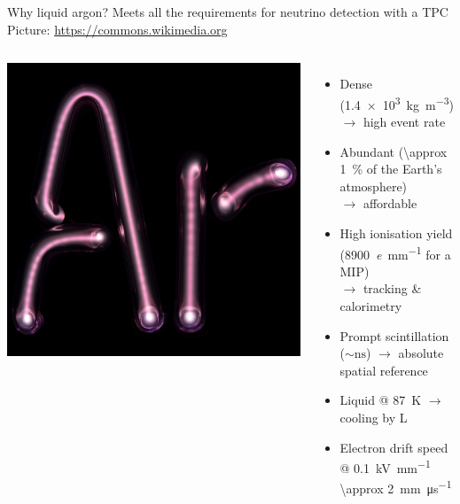 \documentclass[]{beamer}
\newcommand*{\emphcol}{red}
\newcommand*{\emphcoltitle}{blue}
\begin{document}
\begin{frame}{Why liquid argon?}{\color{\emphcoltitle} Meets all the requirements for neutrino detection with a TPC}
	{\tiny Picture: \url{https://commons.wikimedia.org}}
	\begin{columns}[c]
		\centering
		\includegraphics[width=\textwidth]{defence/ArTube}\\
		\begin{itemize}
			\item Dense (\SI{1.4e3}{\kilo\gram\per\cubic\metre}) {\color{\emphcol} $\rightarrow$ high event rate}
			\item Abundant (\SI{\approx 1}{\percent} of the Earth's atmosphere) \\ {\color{\emphcol}$\rightarrow$ affordable}
			\item High ionisation yield (\SI{8900}{\elementarycharge\per\milli\metre} for a MIP) \\ {\color{\emphcol}$\rightarrow$ tracking \& calorimetry}
			\item Prompt scintillation ($\sim \si{\nano\second}$) {\color{\emphcol}$\rightarrow$ absolute spatial reference}
			\item Liquid @ \SI{87}{\kelvin} {\color{\emphcol}$\rightarrow$ cooling by L}
			\item Electron drift speed @ \SI{0.1}{\kilo\volt\per\milli\meter} \SI{\approx 2}{\milli\meter\per\micro\second}
		\end{itemize}
	\end{columns}
\end{frame}
\end{document}
